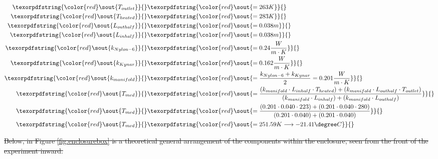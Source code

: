 \documentclass[a4paper,12pt,twoside]{article}
\providecommand{\DIFdeltex}[1]{{\protect\color{red}\sout{#1}}}                      %
\providecommand{\DIFdelbegin}{} %
\providecommand{\DIFdel}[1]{\texorpdfstring{\DIFdeltex{#1}}{}} %
\newcommand{\DIFscaledelfig}{0.5}
\newlength{\DIFdelgraphicswidth} %
\newlength{\DIFdelgraphicsheight} %
\newcommand{\DIFdelincludegraphics}[2][]{%
\sbox{\DIFdelgraphicsbox}{\DIFOincludegraphics[#1]{#2}}%
\settoboxwidth{\DIFdelgraphicswidth}{\DIFdelgraphicsbox} %
\settoboxtotalheight{\DIFdelgraphicsheight}{\DIFdelgraphicsbox} %
\scalebox{\DIFscaledelfig}{%
\parbox[b]{\DIFdelgraphicswidth}{\usebox{\DIFdelgraphicsbox}\\[-\baselineskip] \rule{\DIFdelgraphicswidth}{0em}}\llap{\resizebox{\DIFdelgraphicswidth}{\DIFdelgraphicsheight}{%
\setlength{\unitlength}{\DIFdelgraphicswidth}%
\begin{picture}(1,1)%
\thicklines\linethickness{2pt} %
{\color[rgb]{1,0,0}\put(0,0){\framebox(1,1){}}}%
{\color[rgb]{1,0,0}\put(0,0){\line( 1,1){1}}}%
{\color[rgb]{1,0,0}\put(0,1){\line(1,-1){1}}}%
\end{picture}%
}\hspace*{3pt}}} %
} %
\DeclareRobustCommand{\DIFdelbegin}{\DIFOdelbegin \let\includegraphics\DIFdelincludegraphics} %
\begin{document}
\DIFdelbegin \begin{align*}
    \DIFdel{T_{outlet} }&\DIFdel{= 263 K}\\
    \DIFdel{T_{heated} }&\DIFdel{= 283 K}\\
    \DIFdel{L_{outhalf}}& \DIFdel{= 0.038 m}\\
    \DIFdel{L_{inhalf} }&\DIFdel{= 0.038 m}\\
    \DIFdel{k_{Nylon-6} }&\DIFdel{= 0.24\frac{W}{m\cdot K}}\\
    \DIFdel{k_{Kynar} }&\DIFdel{= 0.162\frac{W}{m\cdot K}}\\
    \DIFdel{k_{manifold} }&\DIFdel{=  \frac{k_{Nylon-6}+k_{Kynar}}{2} = 0.201\frac{W}{m\cdot K}}\\
    \DIFdel{T_{med} }&\DIFdel{= \frac{ (k_{manifold}\cdot L_{inhalf}\cdot T_{heated}) + (k_{manifold}\cdot L_{outhalf}\cdot T_{outlet}) }{ (k_{manifold}\cdot L_{inhalf}) + (k_{manifold}\cdot L_{outhalf})}}\\
    \DIFdel{T_{med} }&\DIFdel{= \frac{ (0.201\cdot 0.040\cdot 223) + (0.201\cdot 0.040\cdot 280)}{(0.201\cdot 0.040) + (0.201\cdot 0.040)}}\\ 
    \DIFdel{T_{med} }&\DIFdel{= 251.59 K \longrightarrow -21.41\degree C
 }\end{align*}

\DIFdel{Below, in Figure \ref{fig:enclosurebox} is a theoretical general arrangement of the components within the enclosure, seen from the front of the experiment inward.
}%
\end{document}
